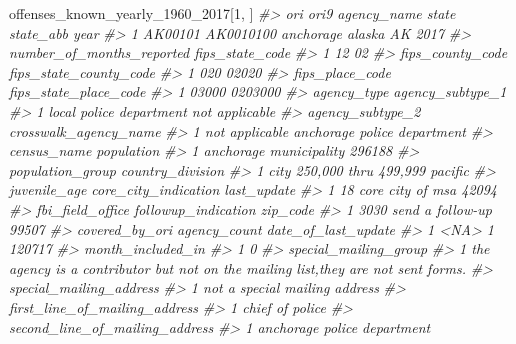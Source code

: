 \documentclass[
  12pt,
  openany]{book}
\newenvironment{Shaded}{\begin{snugshade}}{\end{snugshade}}
\newcommand{\CommentTok}[1]{\textcolor[rgb]{0.37,0.37,0.37}{\textit{#1}}}
\newcommand{\DecValTok}[1]{\textcolor[rgb]{0.06,0.06,0.06}{#1}}
\newcommand{\NormalTok}[1]{#1}
\begin{document}
\begin{Shaded}
\begin{Highlighting}[]
\NormalTok{offenses\_known\_yearly\_1960\_2017[}\DecValTok{1}\NormalTok{, ]}
\CommentTok{\#\textgreater{}       ori      ori9 agency\_name  state state\_abb year}
\CommentTok{\#\textgreater{} 1 AK00101 AK0010100   anchorage alaska        AK 2017}
\CommentTok{\#\textgreater{}   number\_of\_months\_reported fips\_state\_code}
\CommentTok{\#\textgreater{} 1                        12              02}
\CommentTok{\#\textgreater{}   fips\_county\_code fips\_state\_county\_code}
\CommentTok{\#\textgreater{} 1              020                  02020}
\CommentTok{\#\textgreater{}   fips\_place\_code fips\_state\_place\_code}
\CommentTok{\#\textgreater{} 1           03000               0203000}
\CommentTok{\#\textgreater{}               agency\_type agency\_subtype\_1}
\CommentTok{\#\textgreater{} 1 local police department   not applicable}
\CommentTok{\#\textgreater{}   agency\_subtype\_2       crosswalk\_agency\_name}
\CommentTok{\#\textgreater{} 1   not applicable anchorage police department}
\CommentTok{\#\textgreater{}              census\_name population}
\CommentTok{\#\textgreater{} 1 anchorage municipality     296188}
\CommentTok{\#\textgreater{}            population\_group country\_division}
\CommentTok{\#\textgreater{} 1 city 250,000 thru 499,999          pacific}
\CommentTok{\#\textgreater{}   juvenile\_age core\_city\_indication last\_update}
\CommentTok{\#\textgreater{} 1           18     core city of msa       42094}
\CommentTok{\#\textgreater{}   fbi\_field\_office followup\_indication zip\_code}
\CommentTok{\#\textgreater{} 1             3030    send a follow{-}up    99507}
\CommentTok{\#\textgreater{}   covered\_by\_ori agency\_count date\_of\_last\_update}
\CommentTok{\#\textgreater{} 1           \textless{}NA\textgreater{}            1              120717}
\CommentTok{\#\textgreater{}   month\_included\_in}
\CommentTok{\#\textgreater{} 1                 0}
\CommentTok{\#\textgreater{}                                                              special\_mailing\_group}
\CommentTok{\#\textgreater{} 1 the agency is a contributor but not on the mailing list,they are not sent forms.}
\CommentTok{\#\textgreater{}         special\_mailing\_address}
\CommentTok{\#\textgreater{} 1 not a special mailing address}
\CommentTok{\#\textgreater{}   first\_line\_of\_mailing\_address}
\CommentTok{\#\textgreater{} 1               chief of police}
\CommentTok{\#\textgreater{}   second\_line\_of\_mailing\_address}
\CommentTok{\#\textgreater{} 1    anchorage police department}

\end{Highlighting}
\end{Shaded}
\end{document}
